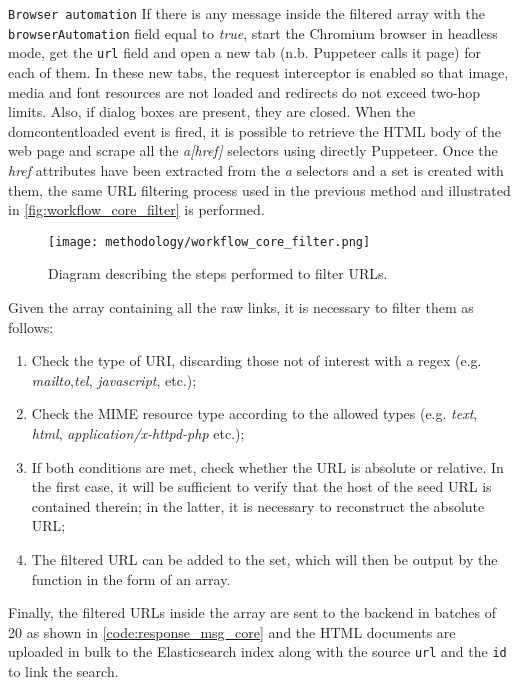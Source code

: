 \documentclass[../thesis.tex]{subfiles}
\begin{document}
\texttt{Browser automation} If there is any message inside the filtered array with the \texttt{browserAutomation} field equal to \textit{true}, start the Chromium browser in headless mode, get the \texttt{url} field and open a new tab (n.b. Puppeteer calls it page) for each of them. In these new tabs, the request interceptor is enabled so that image, media and font resources are not loaded and redirects do not exceed two-hop limits. Also, if dialog boxes are present, they are closed. When the \gls{domcontentloaded} event is fired, it is possible to retrieve the \acrshort{HTML} body of the web page and scrape all the \textit{a[href]} selectors using directly Puppeteer. Once the \textit{href} attributes have been extracted from the \textit{a} selectors and a set is created with them, the same \acrshort{URL} filtering process used in the previous method and illustrated in \autoref{fig:workflow_core_filter} is performed.

\begin{figure}[H]
    \centering
    \texttt{[image: methodology/workflow\_core\_filter.png]}
    \caption[Filter \acrshort{URL}s process workflow]{Diagram describing the steps performed to filter \acrshort{URL}s.}
    \label{fig:workflow_core_filter}
\end{figure}

Given the array containing all the raw links, it is necessary to filter them as follows:

\begin{enumerate}
    \item Check the type of \acrshort{URI}, discarding those not of interest with a regex (e.g. \textit{mailto},\textit{tel}, \textit{javascript}, etc.);
    \item Check the \acrshort{MIME} resource type according to the allowed types (e.g. \textit{text}, \textit{html}, \textit{application/x-httpd-php} etc.);
    \item If both conditions are met, check whether the \acrshort{URL} is absolute or relative. In the first case, it will be sufficient to verify that the host of the seed \acrshort{URL} is contained therein; in the latter, it is necessary to reconstruct the absolute \acrshort{URL};
    \item The filtered \acrshort{URL} can be added to the set, which will then be output by the function in the form of an array.
\end{enumerate}

Finally, the filtered \acrshort{URL}s inside the array are sent to the backend in batches of 20 as shown in \autoref{code:response_msg_core} and the \acrshort{HTML} documents are uploaded in bulk to the Elasticsearch index along with the source \texttt{url} and the \texttt{id} to link the search.
\end{document}

